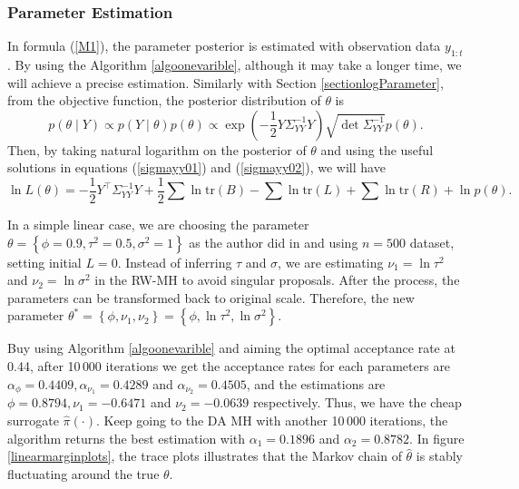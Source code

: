 \subsubsection*{Parameter Estimation}

In formula (\ref{M1}), the parameter posterior is estimated with observation data $y_{1:t}$. By using the Algorithm \ref{algoonevarible}, although it may take a longer time, we will achieve a precise estimation. Similarly with Section \ref{sectionlogParameter}, from the objective function, the posterior distribution of $\theta$ is 
\begin{equation*}
p(\theta \mid Y) \propto p(Y\mid\theta)p(\theta) \propto \exp\left( {-\frac{1}{2} Y \Sigma_{YY}^{-1} Y } \right) \sqrt{\det \Sigma_{YY}^{-1}} p(\theta).
\end{equation*}
Then, by taking natural logarithm on the posterior of $\theta$ and using the useful solutions in equations (\ref{sigmayy01}) and (\ref{sigmayy02}), we will have
\begin{equation}\label{linearlogL}
\ln L(\theta) = -\frac{1}{2}Y^\top\Sigma_{YY}^{-1}Y+\frac{1}{2}\sum\ln\mbox{tr}(B)-\sum\ln\mbox{tr}(L)+\sum\ln\mbox{tr}(R) + \ln p(\theta).
\end{equation}

In a simple linear case, we are choosing the parameter $\theta = \left\lbrace \phi=0.9,\tau^2=0.5,\sigma^2=1\right\rbrace$ as the author did in \cite{lopes2011particle} and using $n=500$ dataset, setting initial $L=0$. Instead of inferring $\tau$ and $\sigma$, we are estimating $\nu_1 = \ln \tau^2$ and $\nu_2 = \ln \sigma^2$ in the RW-MH to avoid singular proposals. After the process, the parameters can be transformed back to original scale. Therefore, the new parameter  $\theta^* =  \left\lbrace \phi,\nu_1,\nu_2\right\rbrace = \left\lbrace \phi,\ln\tau^2,\ln\sigma^2\right\rbrace$. 

Buy using Algorithm \ref{algoonevarible} and aiming the optimal acceptance rate at 0.44, after 10\,000 iterations we get the acceptance rates for each parameters are $\alpha_\phi = 0.4409, \alpha_{\nu_1}= 0.4289$ and $\alpha_{\nu_2}= 0.4505$, and the estimations are $\phi =0.8794, \nu_1= -0.6471$ and $\nu_2= -0.0639$ respectively. Thus, we have the cheap surrogate $\hat{\pi}(\cdot)$. Keep going to the DA MH with another 10\,000 iterations, the algorithm returns the best estimation with $\alpha_1=0.1896$ and $\alpha_2 = 0.8782$. In figure \ref{linearmarginplots}, the trace plots illustrates that the Markov chain of $\hat{\theta}$ is stably fluctuating around the true $\theta$. 

